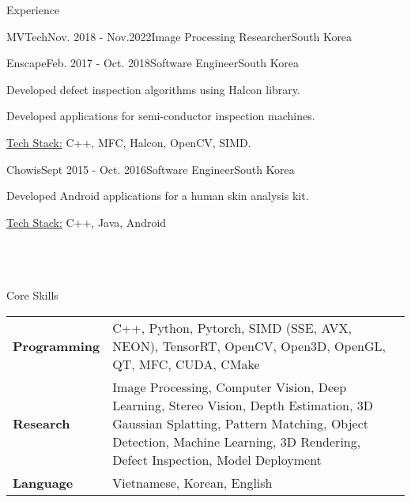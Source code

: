 \documentclass{resume}
\begin{document}
\begin{rSection}{Experience}
\begin{rSubsection}{MVTech}{Nov. 2018 - Nov.2022}{Image Processing Researcher}{South Korea}
		\end{rSubsection}

		\begin{rSubsection}{Enscape}{Feb. 2017 - Oct. 2018}{Software Engineer}{South Korea}
			\item Developed defect inspection algorithms using Halcon library.
			\item Developed applications for semi-conductor inspection machines.
			\item \underline{Tech Stack:} C++, MFC, Halcon, OpenCV,  SIMD.

		\end{rSubsection}

		\begin{rSubsection}{Chowis}{Sept 2015 - Oct. 2016}{Software Engineer}{South Korea}
			\item Developed Android applications for a human skin analysis kit.
			\item \underline{Tech Stack:} C++, Java, Android\\ \\ \\ \\ 

		\end{rSubsection}
	\end{rSection}

	\begin{rSection}{Core Skills}
		\begin{tabular} {p{0.2\linewidth} p{0.8\linewidth}}
			\bf Programming & C++,  Python,  Pytorch, SIMD (SSE, AVX, NEON), TensorRT, OpenCV, Open3D, OpenGL, QT, MFC, CUDA, CMake \\
			\bf Research & Image Processing, Computer Vision,  Deep Learning,  Stereo Vision, Depth Estimation, 3D Gaussian Splatting, Pattern Matching, Object Detection, Machine Learning, 3D Rendering, Defect Inspection, Model Deployment \\
			\bf Language & Vietnamese, Korean, English
		\end{tabular}
	\end{rSection}		
\end{document}
